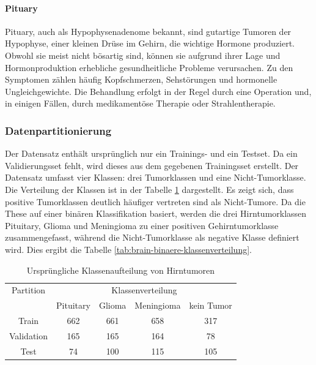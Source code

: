 \paragraph{Pituary} \label{chap:brain-pituary}
Pituary, auch als Hypophysenadenome bekannt, sind gutartige Tumoren der Hypophyse, einer kleinen Drüse im Gehirn, die wichtige Hormone produziert. Obwohl sie meist nicht bösartig sind, können sie aufgrund ihrer Lage und Hormonproduktion erhebliche gesundheitliche Probleme verursachen. Zu den Symptomen zählen häufig Kopfschmerzen, Sehstörungen und hormonelle Ungleichgewichte. Die Behandlung erfolgt in der Regel durch eine Operation und, in einigen Fällen, durch medikamentöse Therapie oder Strahlentherapie.

\subsubsection{Datenpartitionierung} \label{chap:brain-datapartition}
Der Datensatz enthält ursprünglich nur ein Trainings- und ein Testset. Da ein Validierungsset fehlt, wird dieses aus dem gegebenen Trainingsset erstellt. Der Datensatz umfasst vier Klassen: drei Tumorklassen und eine Nicht-Tumorklasse. Die Verteilung der Klassen ist in der Tabelle \ref{tab:brain-orginale-klassenverteilung} dargestellt. Es zeigt sich, dass positive Tumorklassen deutlich häufiger vertreten sind als Nicht-Tumore. Da die These auf einer binären Klassifikation basiert, werden die drei Hirntumorklassen Pituitary, Glioma und Meningioma zu einer positiven Gehirntumorklasse zusammengefasst, während die Nicht-Tumorklasse als negative Klasse definiert wird. Dies ergibt die Tabelle \ref{tab:brain-binaere-klassenverteilung}.

\begin{table}[H]
    \centering
    \begin{tabular}{@{}ccccc@{}}
        \toprule
         Partition & \multicolumn{4}{c}{Klassenverteilung}              \\ 
        \cmidrule(l){2-5}
                    & Pituitary & Glioma & Meningioma & kein Tumor      \\ 
        \midrule 
        Train      & 662 & 661 & 658 & 317                              \\
        Validation & 165 & 165 & 164 & 78                               \\
        Test       & 74  & 100 & 115 & 105                              \\ 
        \bottomrule
    \end{tabular}
    \caption{Ursprüngliche Klassenaufteilung von Hirntumoren}
    \label{tab:brain-orginale-klassenverteilung}
\end{table}

